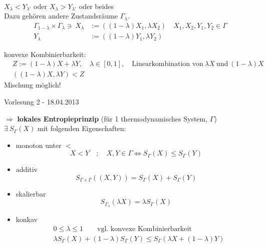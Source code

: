 \documentclass[10pt]{scrartcl}
\begin{document}
\begin{itemize}
\begin{fleqn}
\begin{equation}
\begin{aligned}
\end{aligned}
\end{equation}
${X}_\lambda < {Y}_{\lambda'}$ oder ${X}_\lambda > {Y}_{\lambda'}$ oder beides\\
Dazu gehören andere Zustandsräume $\Gamma_\lambda$.\\
\begin{equation}
\begin{aligned}
\Gamma_{1-\lambda} \times \Gamma_\lambda \ni \ X_\lambda &:=((1-\lambda)X_1,\lambda X_2) \quad X_1,X_2,Y_1,Y_{2} \in \Gamma\\
Y_\lambda &:=((1-\lambda)Y_1,\lambda Y_2)
\end{aligned}
\end{equation}

\item konvexe Kombinierbarkeit:\\
\begin{equation}
\begin{aligned}
&Z:=(1-\lambda)X +\lambda Y, \quad \lambda \in [0,1], \quad \text{Linearkombination von} \ \lambda X \ \text{und} \ (1-\lambda)X\\
&((1-\lambda)X,\lambda Y)<Z
\end{aligned}
\end{equation}
Mischung möglich!
\end{fleqn}
\end{itemize}
\begin{flushright}Vorlesung 2 - 18.04.2013\end{flushright}
$\Rightarrow$ \textbf{lokales Entropieprinzip} (für 1 thermodynamisches System, $\Gamma$)\\
$\exists \ S_\Gamma(X)$ mit folgenden Eigenschaften: 
\begin{fleqn}
\begin{itemize}
\item monoton unter $<$
\begin{equation}
X<Y \quad ; \quad X,Y \in \Gamma \Leftrightarrow S_\Gamma(X) \leq S_\Gamma(Y)
\end{equation}
\item additiv
\begin{equation}
S_{\Gamma \times \Gamma}((X,Y))=S_\Gamma(X)+S_\Gamma(Y)
\end{equation}
\item skalierbar 
\begin{equation}
S_{\Gamma_\lambda}(\lambda X)=\lambda S_\Gamma(X)
\end{equation}
\item konkav
\begin{equation}
\begin{aligned}
&0 \leq \lambda \leq 1 \quad \quad \text{vgl. konvexe Kombinierbarkeit}\\
&\lambda S_\Gamma(X)+(1-\lambda)S_\Gamma(Y) \leq S_\Gamma(\lambda X +(1-\lambda)Y)
\end{aligned}
\end{equation}
\end{itemize}
\end{fleqn}
\end{document}
